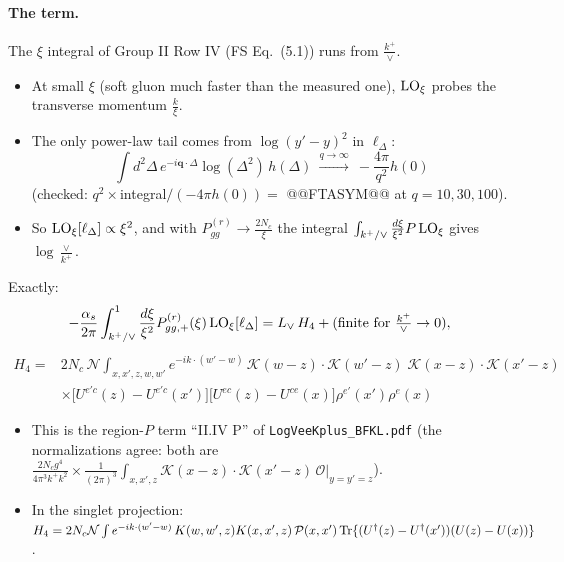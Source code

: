 \documentclass[10pt]{article}
\numberwithin{equation}{section}
\newcommand{\Lv}{L_{\vee}}
\newcommand{\KK}{\mathcal K}
\newcommand{\OO}{\mathcal O}
\newcommand{\NN}{\mathcal N}
\newcommand{\pre}{\frac{1}{(2\pi)^3}}
\newcommand{\phw}{e^{-ik\cdot(w'-w)}}
\begin{document}
\paragraph{The term.} The $\xi$ integral of Group II Row IV (FS Eq.~(5.1)) runs from $\frac{k^+}{\vee}$.
\begin{itemize}
\item At small $\xi$ (soft gluon much faster than the measured one), ${\rm LO}_\xi$ probes the transverse momentum $\frac{k}{\xi}$.
\item The only power-law tail comes from $\log(y'-y)^2$ in $\ell_\Delta$:
\begin{equation}
\int d^2\Delta\,e^{-i\mathbf q\cdot\Delta}\log(\Delta^2)\,h(\Delta)\ \xrightarrow{q\to\infty}\ -\frac{4\pi}{q^2}h(0)
\end{equation}
(checked: $q^2\times$integral$/(-4\pi h(0))=$ @@FTASYM@@ at $q=10,30,100$).
\item So ${\rm LO}_\xi[\ell_\Delta]\propto\xi^2$, and with $P^{(r)}_{gg}\to\frac{2N_c}{\xi}$ the integral $\int_{k^+/\vee}\frac{d\xi}{\xi^2}P\,{\rm LO}_\xi$ gives $\log\frac{\vee}{k^+}$.
\end{itemize}
Exactly:
\begin{equation}
-\frac{\alpha_s}{2\pi}\int_{k^+/\vee}^1\frac{d\xi}{\xi^2}P^{(r)}_{gg,+}(\xi)\,{\rm LO}_\xi[\ell_\Delta]=\Lv\,H_4+(\text{finite for }\tfrac{k^+}{\vee}\to0),
\end{equation}
\begin{equation}
\boxed{\begin{aligned}H_4={}&2N_c\,\NN\int_{x,x',z,w,w'}\phw\,\KK(w-z)\cdot\KK(w'-z)\;\KK(x-z)\cdot\KK(x'-z)\\&\times\big[U^{e'c}(z)-U^{e'c}(x')\big]\big[U^{ec}(z)-U^{ce}(x)\big]\rho^{e'}(x')\rho^e(x)\end{aligned}}
\end{equation}
\begin{itemize}
\item This is the region-$P$ term ``II.IV P'' of \texttt{LogVeeKplus\_BFKL.pdf} (the normalizations agree: both are $\frac{2N_cg^4}{4\pi^3k^+k^2}\times\pre\int_{x,x',z}\KK(x-z)\cdot\KK(x'-z)\,\OO|_{y=y'=z}$).
\item In the singlet projection: $H_4=2N_c\NN\int\phw\,K(w,w',z)K(x,x',z)\,\mathcal P(x,x')\,{\rm Tr}\{(U^\dagger(z)-U^\dagger(x'))(U(z)-U(x))\}$.
\end{itemize}
\end{document}
